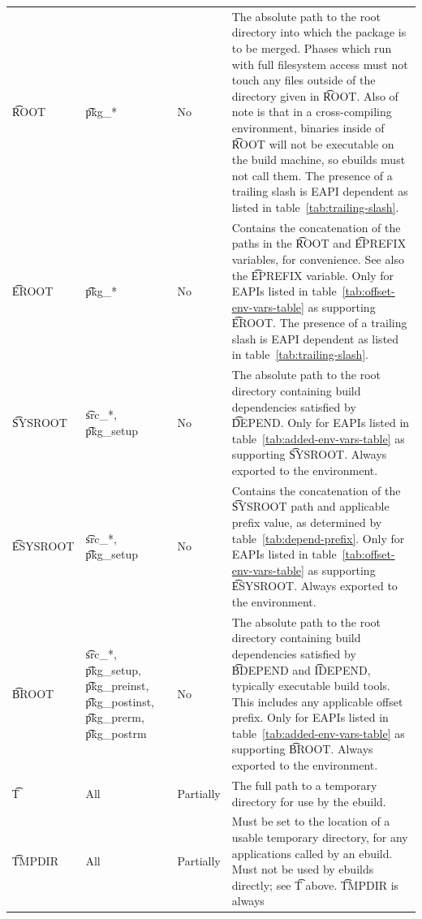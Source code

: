 \begin{landscape}
\begin{longtable}{l P{7em} l p{\mycolwidth}}
\t{ROOT} &
    \t{pkg_*} &
    No &
    The absolute path to the root directory into which the package is to be merged. Phases which
    run with full filesystem access must not touch any files outside of the directory given in
    \t{ROOT}\@. Also of note is that in a cross-compiling environment, binaries inside of \t{ROOT}
    will not be executable on the build machine, so ebuilds must not call them. The presence of
    a trailing slash is EAPI dependent as listed in table~\ref{tab:trailing-slash}. \\
\t{EROOT} &
    \t{pkg_*} &
    No &
    Contains the concatenation of the paths in the \t{ROOT} and \t{EPREFIX} variables,
    for convenience. See also the \t{EPREFIX} variable. Only for EAPIs listed in
    table~\ref{tab:offset-env-vars-table} as supporting \t{EROOT}\@. The presence of a trailing
    slash is EAPI dependent as listed in table~\ref{tab:trailing-slash}. \\
\t{SYSROOT} &
    \t{src_*}, \t{pkg_setup} &
    No &
     The absolute path to the root directory containing build dependencies
    satisfied by \t{DEPEND}\@. Only for EAPIs listed in table~\ref{tab:added-env-vars-table}
    as supporting \t{SYSROOT}\@. Always exported to the environment. \\
\t{ESYSROOT} &
    \t{src_*}, \t{pkg_setup} &
    No &
    Contains the concatenation of the \t{SYSROOT} path and applicable prefix value, as determined
    by table~\ref{tab:depend-prefix}. Only for EAPIs listed in table~\ref{tab:offset-env-vars-table}
    as supporting \t{ESYSROOT}\@. Always exported to the environment. \\
\t{BROOT} &
    \t{src_*}, \t{pkg_setup}, \t{pkg_preinst}, \t{pkg_postinst}, \t{pkg_prerm},
    \t{pkg_postrm} &
    No &
     The absolute path to the root directory containing build dependencies
    satisfied by \t{BDEPEND} and \t{IDEPEND}, typically executable build tools. This includes any
    applicable offset prefix. Only for EAPIs listed in table~\ref{tab:added-env-vars-table} as
    supporting \t{BROOT}\@. Always exported to the environment. \\
\t{T} &
    All &
    Partially &
    The full path to a temporary directory for use by the ebuild. \\
\t{TMPDIR} &
    All &
    Partially &
    Must be set to the location of a usable temporary directory, for any applications called
    by an ebuild. Must not be used by ebuilds directly; see \t{T} above. \t{TMPDIR} is always

\end{longtable}
\end{landscape}
